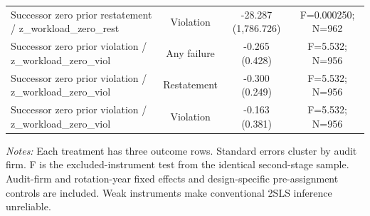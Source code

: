 \documentclass[10pt]{article}
\begin{document}
\begin{minipage}{19cm}
\begin{threeparttable}
\begin{tabular}{p{}ccc}
Successor zero prior restatement / z\_workload\_zero\_rest & Violation & -28.287 (1,786.726) & F=0.000250; N=962 \\
Successor zero prior violation / z\_workload\_zero\_viol & Any failure & \shortstack{-0.265\\(0.428)} & F=5.532; N=956 \\
Successor zero prior violation / z\_workload\_zero\_viol & Restatement & \shortstack{-0.300\\(0.249)} & F=5.532; N=956 \\
Successor zero prior violation / z\_workload\_zero\_viol & Violation & \shortstack{-0.163\\(0.381)} & F=5.532; N=956 \\
\bottomrule
\end{tabular}
\begin{tablenotes}\fontsize{9}{11}\selectfont
\item \raggedright \fontsize{9}{11}\selectfont \textit{Notes:} Each treatment has three outcome rows. Standard errors cluster by audit firm. F is the excluded-instrument test from the identical second-stage sample. Audit-firm and rotation-year fixed effects and design-specific pre-assignment controls are included. Weak instruments make conventional 2SLS inference unreliable.
\end{tablenotes}
\end{threeparttable}

\end{minipage}
\end{document}
